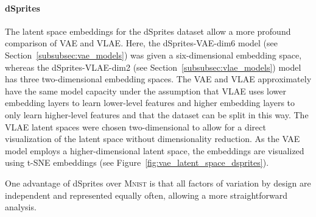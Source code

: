 \paragraph{dSprites}

The latent space embeddings for the dSprites dataset allow a more profound comparison of \ac{VAE} and \ac{VLAE}.
Here, the dSprites-\ac{VAE}-dim6 model (see Section~\ref{subsubsec:vae_models}) was given a six-dimensional embedding space, whereas the dSprites-\ac{VLAE}-dim2 (see Section~\ref{subsubsec:vlae_models}) model has three two-dimensional embedding spaces.
The \ac{VAE} and \ac{VLAE} approximately have the same model capacity under the assumption that \ac{VLAE} uses lower embedding layers to learn lower-level features and higher embedding layers to only learn higher-level features and that the dataset can be split in this way.
The \ac{VLAE} latent spaces were chosen two-dimensional to allow for a direct visualization of the latent space without dimensionality reduction.
As the \ac{VAE} model employs a higher-dimensional latent space, the embeddings are visualized using \ac{t-SNE} embeddings (see Figure~\ref{fig:vae_latent_space_dsprites}).

One advantage of dSprites over \textsc{Mnist} is that all factors of variation by design are independent and represented equally often, allowing a more straightforward analysis.

